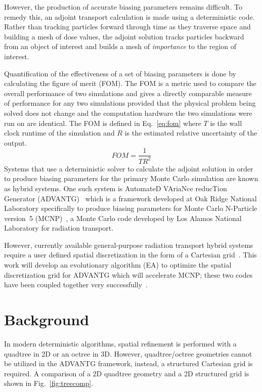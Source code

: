 \documentclass[conference]{IEEEtran}
\begin{document}
However, the production of accurate biasing parameters remains difficult. To remedy this, an adjoint transport calculation is made using a deterministic code. Rather than tracking particles forward through time as they traverse space and building a mesh of dose values, the adjoint solution tracks particles backward from an object of interest and builds a mesh of \textit{importance} to the region of interest.

Quantification of the effectiveness of a set of biasing parameters is done by calculating the figure of merit (FOM). The FOM is a metric used to compare the overall performance of two simulations and gives a directly comparable measure of performance for any two simulations provided that the physical problem being solved does not change and the computation hardware the two simulations were run on are identical. The FOM is defined in Eq.~\ref{eq:fom} where $T$ is the wall clock runtime of the simulation and $R$ is the estimated relative uncertainty of the output.
\begin{equation} \label{eq:fom}
FOM = \frac{1}{T R^2}
\end{equation}
Systems that use a deterministic solver to calculate the adjoint solution in order to produce biasing parameters for the primary Monte Carlo simulation are known as hybrid systems. One such system is AutomateD VAriaNce reducTion Generator (ADVANTG)~\cite{ref:Mosher2015} which is a framework developed at Oak Ridge National Laboratory specifically to produce biasing parameters for Monte Carlo N-Particle version~5 (MCNP)~\cite{ref:X5}, a Monte Carlo code developed by Los Alamos National Laboratory for radiation transport. 

However, currently available general-purpose radiation transport hybrid systems require a user defined spatial discretization in the form of a Cartesian grid~\cite{ref:Wagner2014, ref:Mosher2015}. This work will develop an evolutionary algorithm (EA) to optimize the spatial discretization grid for ADVANTG which will accelerate MCNP; these two codes have been coupled together very successfully~\cite{ref:Blakeman2007, ref:Risner2013, ref:Ibrahim2011, ref:Wagner2011}.

\section{Background}
In modern deterministic algorithms, spatial refinement is performed with a quadtree in 2D or an octree in 3D. However, quadtree/octree geometries cannot be utilized in the ADVANTG framework, instead, a structured Cartesian grid is required. A comparison of a 2D quadtree geometry and a 2D structured grid is shown in Fig.~\ref{fig:treecomp}. 
\end{document}
